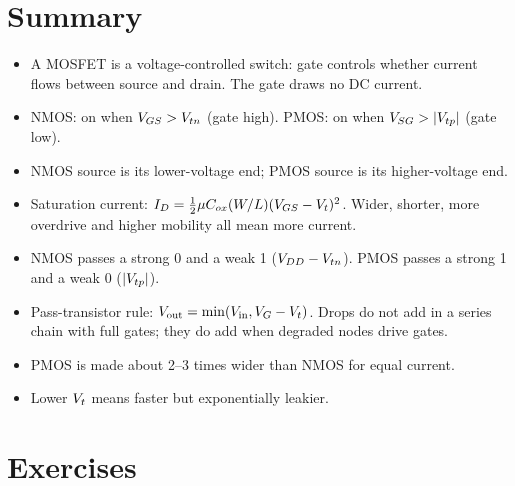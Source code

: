 \section{Summary}

\begin{itemize}
  \item A MOSFET is a voltage-controlled switch: gate controls whether current flows between source and drain. The gate draws no DC current.
  \item NMOS: on when $V_{GS} > V_{tn}$ (gate high). PMOS: on when $V_{SG} > |V_{tp}|$ (gate low).
  \item NMOS source is its lower-voltage end; PMOS source is its higher-voltage end.
  \item Saturation current: $I_D = \tfrac12\mu C_{ox}(W/L)(V_{GS}-V_{t})^2$. Wider, shorter, more overdrive and higher mobility all mean more current.
  \item NMOS passes a strong 0 and a weak 1 ($V_{DD} - V_{tn}$). PMOS passes a strong 1 and a weak 0 ($|V_{tp}|$).
  \item Pass-transistor rule: $V_{\text{out}} = \min(V_{\text{in}}, V_G - V_{t})$. Drops do not add in a series chain with full gates; they do add when degraded nodes drive gates.
  \item PMOS is made about 2--3 times wider than NMOS for equal current.
  \item Lower $V_{t}$ means faster but exponentially leakier.
\end{itemize}

\section{Exercises}

